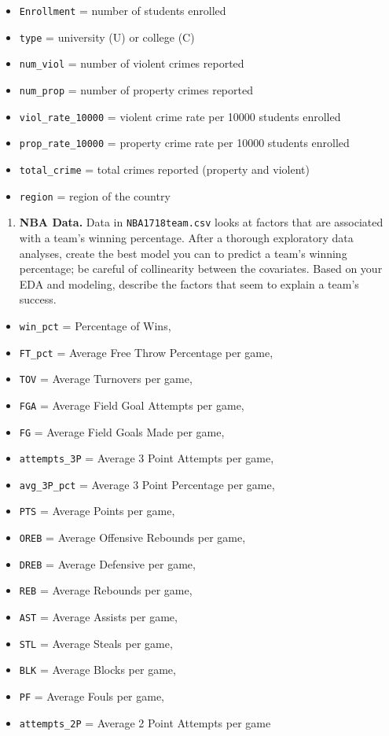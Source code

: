 \documentclass[
]{krantz}
\providecommand{\tightlist}{%
  \setlength{\itemsep}{0pt}\setlength{\parskip}{0pt}}
\begin{document}
\begin{itemize}
\tightlist
\item
  \texttt{Enrollment} = number of students enrolled
\item
  \texttt{type} = university (U) or college (C)
\item
  \texttt{num\_viol} = number of violent crimes reported
\item
  \texttt{num\_prop} = number of property crimes reported
\item
  \texttt{viol\_rate\_10000} = violent crime rate per 10000 students enrolled
\item
  \texttt{prop\_rate\_10000} = property crime rate per 10000 students enrolled
\item
  \texttt{total\_crime} = total crimes reported (property and violent)
\item
  \texttt{region} = region of the country
\end{itemize}

\begin{enumerate}
\def\labelenumi{\arabic{enumi}.}
\setcounter{enumi}{2}
\tightlist
\item
  \textbf{NBA Data.} Data in \texttt{NBA1718team.csv} \citep{rossotti} looks at factors that are associated with a team's winning percentage. After a thorough exploratory data analyses, create the best model you can to predict a team's winning percentage; be careful of collinearity between the covariates. Based on your EDA and modeling, describe the factors that seem to explain a team's success.
\end{enumerate}

\begin{itemize}
\tightlist
\item
  \texttt{win\_pct} = Percentage of Wins,
\item
  \texttt{FT\_pct} = Average Free Throw Percentage per game,
\item
  \texttt{TOV} = Average Turnovers per game,
\item
  \texttt{FGA} = Average Field Goal Attempts per game,
\item
  \texttt{FG} = Average Field Goals Made per game,
\item
  \texttt{attempts\_3P} = Average 3 Point Attempts per game,
\item
  \texttt{avg\_3P\_pct} = Average 3 Point Percentage per game,
\item
  \texttt{PTS} = Average Points per game,
\item
  \texttt{OREB} = Average Offensive Rebounds per game,
\item
  \texttt{DREB} = Average Defensive per game,
\item
  \texttt{REB} = Average Rebounds per game,
\item
  \texttt{AST} = Average Assists per game,
\item
  \texttt{STL} = Average Steals per game,
\item
  \texttt{BLK} = Average Blocks per game,
\item
  \texttt{PF} = Average Fouls per game,
\item
  \texttt{attempts\_2P} = Average 2 Point Attempts per game
\end{itemize}
\end{document}
